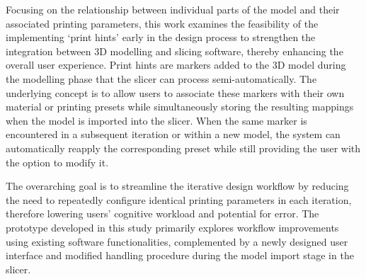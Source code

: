 Focusing on the relationship between individual parts of the model and their associated printing parameters, this work examines the feasibility of the implementing `print hints' early in the design process to strengthen the integration between 3D modelling and slicing software, thereby enhancing the overall user experience. 
Print hints are markers added to the 3D model during the modelling phase that the slicer can process semi-automatically. 
The underlying concept is to allow users to associate these markers with their own material or printing presets while simultaneously storing the resulting mappings when the model is imported into the slicer.
When the same marker is encountered in a subsequent iteration or within a new model, the system can automatically reapply the corresponding preset while still providing the user with the option to modify it.

The overarching goal is to streamline the iterative design workflow by reducing the need to repeatedly configure identical printing parameters in each iteration, therefore lowering users' cognitive workload and potential for error.
The prototype developed in this study primarily explores workflow improvements using existing software functionalities, complemented by a newly designed user interface and modified handling procedure during the model import stage in the slicer.